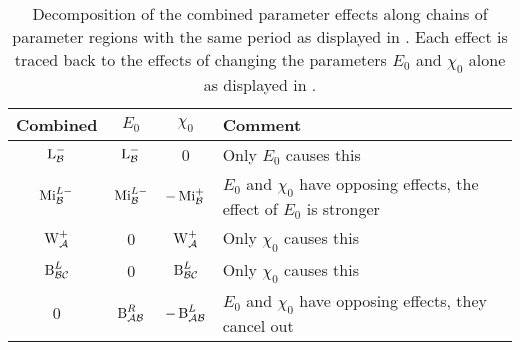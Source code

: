 \begin{table}
	\centering
	\begin{tabular}{|c|c|c|l|} \hline
		Combined         & $E_0$            & $\chi_0$          & Comment                   \\ \hline \hline
		$\operatorname{L}_{\mathcal{B}}^{-}$   & $\operatorname{L}_{\mathcal{B}}^{-}$   & 0                 & Only $E_0$ causes this    \\ \hline
		$\operatorname{Mi}_{\mathcal{B}}^{L-}$ & $\operatorname{Mi}_{\mathcal{B}}^{L-}$ & $-\operatorname{Mi}_{\mathcal{B}}^{+}$  &
		$E_0$ and $\chi_0$ have opposing effects, the effect of $E_0$ is stronger           \\ \hline
		$\operatorname{W}_{\mathcal{A}}^{+}$   & 0                & $\operatorname{W}_{\mathcal{A}}^{+}$    & Only $\chi_0$ causes this \\ \hline \hline
		$\operatorname{B}_{\mathcal{B}\mathcal{C}}^{L}$ & 0                & $\operatorname{B}_{\mathcal{B}\mathcal{C}}^{L}$  & Only $\chi_0$ causes this \\ \hline
		0                & $\operatorname{B}_{\mathcal{A}\mathcal{B}}^{R}$ & $-\operatorname{B}_{\mathcal{A}\mathcal{B}}^{L}$ &
		$E_0$ and $\chi_0$ have opposing effects, they cancel out                           \\ \hline
	\end{tabular}
	\caption[Decomposition table of combined parameter effects]{
		Decomposition of the combined parameter effects along chains of parameter regions with the same period as displayed in .
		Each effect is traced back to the effects of changing the parameters $E_0$ and $\chi_0$ alone as displayed in  .
	}
	\label{table:setup.char.paramfx}
\end{table}
